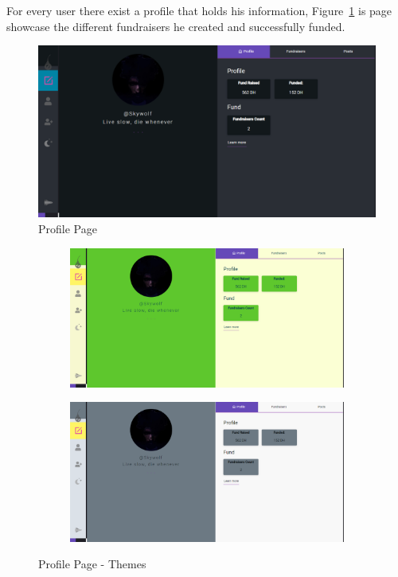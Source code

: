 For every user there exist a profile that holds his information, Figure~\ref{fig:profile view} is page showcase the different fundraisers 
he created and successfully funded.
\begin{figure}[H]
      \centering
      \includegraphics[scale=0.45]{assets/screen-profile-da.png}
      \caption{Profile Page}
      \label{fig:profile view}
\end{figure}

\begin{figure}
      \centering
      \begin{subfigure}[H]{0.4\textwidth}
          \centering
          \includegraphics[width=\textwidth]{assets/screen-profile-gre.png}
      \end{subfigure}
      \hfill
      \begin{subfigure}[H]{0.4\textwidth}
          \centering
          \includegraphics[width=\textwidth]{assets/screen-profile-grey.png}
      \end{subfigure}
      \caption{Profile Page - Themes}
  
 \end{figure}





